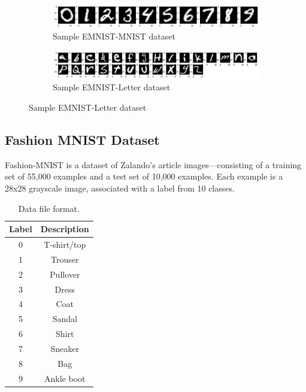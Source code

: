 \begin{figure}[htb!]
        \centering
        \begin{subfigure}[b]{\textwidth}
            \centering
            \includegraphics[width=\linewidth]{images/digit.png}
            \caption{Sample EMNIST-MNIST dataset}
            \label{fig:EMNIST MNIST dataset}
        \end{subfigure}%
        \label{fig:Rotate-misclassifications}
        \begin{subfigure}[b]{\textwidth}
            \centering
            \includegraphics[width=\linewidth]{images/letter.png}
            \caption{Sample EMNIST-Letter dataset}
            \label{fig:EMNIST MNIST dataset}
        \end{subfigure}%
        \label{fig:Rotate-misclassifications}
    \end{figure}
    \FloatBarrier

    
\subsection{Fashion MNIST Dataset}
Fashion-MNIST is a dataset of Zalando's article images—consisting of a training set of 55,000 examples and a test set of 10,000 examples. Each example is a 28x28 grayscale image, associated with a label from 10 classes. 

\begin{table}[ht]
\centering
\begin{tabular}{|c|c|}
\hline
\textbf{Label} & \textbf{Description} \\ \hline
0  &   T-shirt/top \\ \hline
1  &   Trouser \\ \hline
2   &	Pullover \\ \hline
3   &	Dress \\ \hline
4   &	Coat \\ \hline
5   &	Sandal \\ \hline
6   &	Shirt \\ \hline
7   &	Sneaker \\ \hline
8   &	Bag \\ \hline
9   &	Ankle boot \\ \hline
\end{tabular}
\caption{Data file format.}
\label{tbl:training-file-format}
\end{table}

